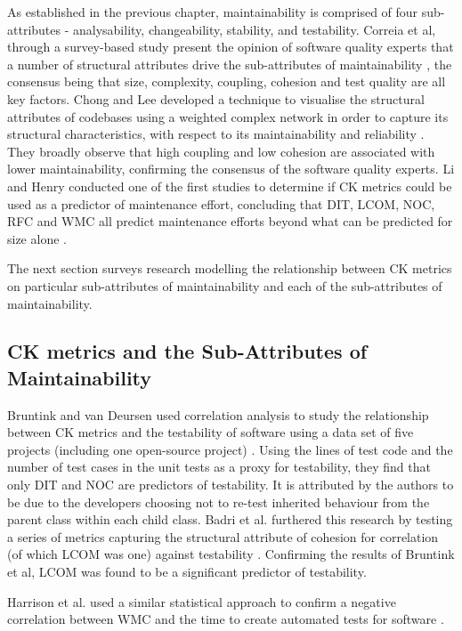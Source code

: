 As established in the previous chapter, maintainability is comprised of four sub-attributes - analysability, changeability, stability, and testability. Correia et al, through a survey-based study present the opinion of software quality experts that a number of structural attributes drive the sub-attributes of maintainability \citep{correia2009survey}, the consensus being that size, complexity, coupling, cohesion and test quality are all key factors. Chong and Lee developed a technique to visualise the structural attributes of codebases using a weighted complex network in order to capture its structural characteristics, with respect to its maintainability and reliability \citep{chong2015analyzing}. They broadly observe that high coupling and low cohesion are associated with lower maintainability, confirming the consensus of the software quality experts. Li and Henry conducted one of the first studies to determine if CK metrics could be used as a predictor of maintenance effort, concluding that DIT, LCOM, NOC, RFC and WMC all predict maintenance efforts beyond what can be predicted for size alone \citep{li1993object}.

The next section surveys research modelling the relationship between CK metrics on particular sub-attributes of maintainability and each of the sub-attributes of maintainability.

\subsection{CK metrics and the Sub-Attributes of Maintainability}
Bruntink and van Deursen used correlation analysis to study the relationship between CK metrics and the testability of software using a data set of five projects (including one open-source project) \citep{bruntink2006empirical}. Using the lines of test code and the number of test cases in the unit tests as a proxy for testability, they find that only DIT and NOC are predictors of testability. It is attributed by the authors to be due to the developers choosing not to re-test inherited behaviour from the parent class within each child class. Badri et al. furthered this research by testing a series of metrics capturing the structural attribute of cohesion for correlation (of which LCOM was one) against testability \citep{badri2011empirical}. Confirming the results of Bruntink et al, LCOM was found to be a significant predictor of testability. 

Harrison et al. used a similar statistical approach to confirm a negative correlation between WMC and the time to create automated tests for software \citep{harrison1998investigation}. 

